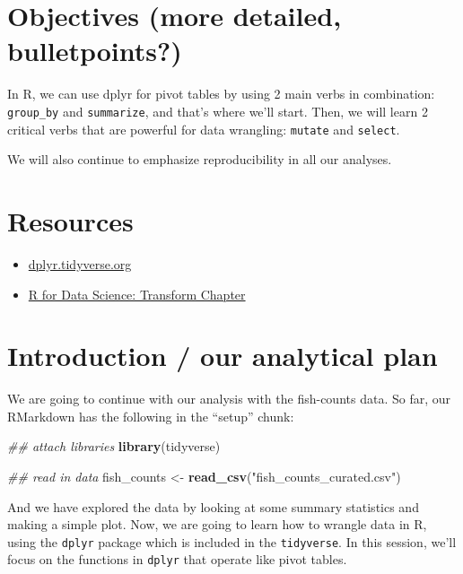 \documentclass[]{book}
\newenvironment{Shaded}{\begin{snugshade}}{\end{snugshade}}
\newcommand{\CommentTok}[1]{\textcolor[rgb]{0.56,0.35,0.01}{\textit{#1}}}
\newcommand{\KeywordTok}[1]{\textcolor[rgb]{0.13,0.29,0.53}{\textbf{#1}}}
\newcommand{\NormalTok}[1]{#1}
\newcommand{\StringTok}[1]{\textcolor[rgb]{0.31,0.60,0.02}{#1}}
\providecommand{\tightlist}{%
  \setlength{\itemsep}{0pt}\setlength{\parskip}{0pt}}
\begin{document}
\hypertarget{objectives-more-detailed-bulletpoints-2}{%
\section{Objectives (more detailed, bulletpoints?)}\label{objectives-more-detailed-bulletpoints-2}}

In R, we can use dplyr for pivot tables by using 2 main verbs in combination: \texttt{group\_by} and \texttt{summarize}, and that's where we'll start. Then, we will learn 2 critical verbs that are powerful for data wrangling: \texttt{mutate} and \texttt{select}.

We will also continue to emphasize reproducibility in all our analyses.

\hypertarget{resources-3}{%
\section{Resources}\label{resources-3}}

\begin{itemize}
\tightlist
\item
  \href{https://dplyr.tidyverse.org/}{dplyr.tidyverse.org}
\item
  \href{https://r4ds.had.co.nz/transform.html}{R for Data Science: Transform Chapter}
\end{itemize}

\hypertarget{introduction-our-analytical-plan}{%
\section{Introduction / our analytical plan}\label{introduction-our-analytical-plan}}

We are going to continue with our analysis with the fish-counts data. So far, our RMarkdown has the following in the ``setup'' chunk:

\begin{Shaded}
\begin{Highlighting}[]
\CommentTok{## attach libraries}
\KeywordTok{library}\NormalTok{(tidyverse)}

\CommentTok{## read in data}
\NormalTok{fish_counts <-}\StringTok{ }\KeywordTok{read_csv}\NormalTok{(}\StringTok{"fish_counts_curated.csv"}\NormalTok{)}
\end{Highlighting}
\end{Shaded}

And we have explored the data by looking at some summary statistics and making a simple plot. Now, we are going to learn how to wrangle data in R, using the \texttt{dplyr} package which is included in the \texttt{tidyverse}. In this session, we'll focus on the functions in \texttt{dplyr} that operate like pivot tables.
\end{document}
